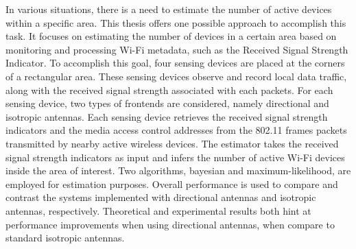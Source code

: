\TAMUAbstractFormat

In various situations, there is a need to estimate the number of active devices within a specific area.
This thesis offers one possible approach to accomplish this task.
It focuses on estimating the number of devices in a certain area based on monitoring and processing Wi-Fi metadata, such as the Received Signal Strength Indicator.
To accomplish this goal, four sensing devices are placed at the corners of a rectangular area.
These sensing devices observe and record local data traffic, along with the received signal strength associated with each packets.
For each sensing device, two types of frontends are considered, namely directional and isotropic antennas.
Each sensing device retrieves the received signal strength indicators and the media access control addresses from the 802.11 frames packets transmitted by nearby active wireless devices.
The estimator takes the received signal strength indicators as input and infers the number of active Wi-Fi devices inside the area of interest.
Two algorithms, bayesian and maximum-likelihood, are employed for estimation purposes.
Overall performance is used to compare and contrast the systems implemented with directional antennas and isotropic antennas, respectively.
Theoretical and experimental results both hint at performance improvements when using directional antennas, when compare to standard isotropic antennas.

